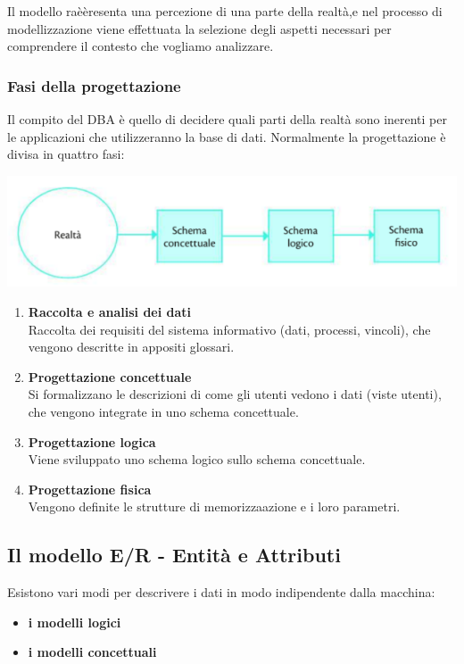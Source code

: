\documentclass{article}
\begin{document}
Il modello raèèresenta una percezione di una parte della realtà,e nel processo di modellizzazione viene effettuata la selezione degli aspetti necessari per comprendere il contesto che vogliamo analizzare.

\subsubsection{Fasi della progettazione}
Il compito del DBA è quello di decidere quali parti della realtà sono inerenti per le applicazioni che utilizzeranno la base di dati.
Normalmente la progettazione è divisa in quattro fasi:

\begin{center}
\includegraphics[scale=1.1]{fasi.PNG}
    
\end{center}


\begin{enumerate}
    \item \textbf{Raccolta e analisi dei dati}\\
    Raccolta dei requisiti del sistema informativo (dati, processi, vincoli), che vengono descritte in appositi glossari.
    \item \textbf{Progettazione concettuale}\\
    Si formalizzano le descrizioni di come gli utenti vedono i dati (viste utenti), che vengono integrate in uno schema concettuale.
    \item \textbf{Progettazione logica}\\
    Viene sviluppato uno schema logico sullo schema concettuale.
    \item \textbf{Progettazione fisica}\\
    Vengono definite le strutture di memorizzaazione e i loro parametri.
\end{enumerate}

\subsection{Il modello E/R - Entità e Attributi}

Esistono vari modi per descrivere i dati in modo indipendente dalla macchina:
\begin{itemize}
    \item \textbf{i modelli logici}
    \item \textbf{i modelli concettuali }
\end{itemize}
\end{document}
